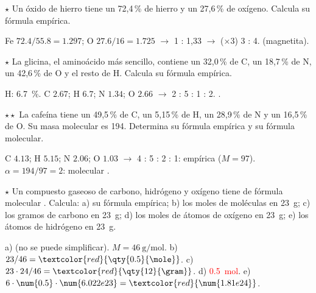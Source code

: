 \begin{exercise}
    \(\star\) Un óxido de hierro tiene un 72,4\,\% de hierro y un 27,6\,\% de oxígeno. Calcula su fórmula empírica.
    \begin{solu}
        Fe \(\num{72.4}/\num{55.8} = \num{1.297}\); O \(\num{27.6}/16 = \num{1.725}\) \(\rightarrow\) 1 : 1,33 \(\rightarrow\) (×3) 3 : 4.
        \textcolor{red}{} (magnetita).
    \end{solu}
\end{exercise}

\begin{exercise}
    \(\star\) La glicina, el aminoácido más sencillo, contiene un 32,0\,\% de C, un 18,7\,\% de N, un 42,6\,\% de O y el resto de
    H. Calcula su fórmula empírica.
    \begin{solu}
        H: \qty{6.7}{\percent}. C \(\num{2.67}\); H \(\num{6.7}\); N \(\num{1.34}\); O \(\num{2.66}\) \(\rightarrow\) 2 : 5 : 1 : 2.
        \textcolor{red}{}.
    \end{solu}
\end{exercise}

\begin{exercise}
    \(\star\star\) La cafeína tiene un 49,5\,\% de C, un 5,15\,\% de H, un 28,9\,\% de N y un 16,5\,\% de O. Su masa molecular es 194.
    Determina su fórmula empírica y su fórmula molecular.
    \begin{solu}
        C \(\num{4.13}\); H \(\num{5.15}\); N \(\num{2.06}\); O \(\num{1.03}\) \(\rightarrow\) 4 : 5 : 2 : 1: empírica \textcolor{red}{}
        (\(M = 97\)). \(\alpha = 194/97 = 2\): molecular \textcolor{red}{}.
    \end{solu}
\end{exercise}

\begin{exercise}
    \(\star\) Un compuesto gaseoso de carbono, hidrógeno y oxígeno tiene de fórmula molecular . Calcula: a) su fórmula
    empírica; b) los moles de moléculas en \qty{23}{\gram}; c) los gramos de carbono en \qty{23}{\gram}; d) los moles de átomos de
    oxígeno en \qty{23}{\gram}; e) los átomos de hidrógeno en \qty{23}{\gram}.
    \begin{solu}
        a) \textcolor{red}{} (no se puede simplificar). \(M = \qty{46}{\gram\per\mole}\). b) \(23/46 = \textcolor{red}{\qty{0.5}{\mole}}\).
        c) \(23 \cdot 24/46 = \textcolor{red}{\qty{12}{\gram}}\). d) \textcolor{red}{\qty{0.5}{\mole}}. e) \(6 \cdot \num{0.5} \cdot \num{6.022e23} = \textcolor{red}{\num{1.81e24}}\).
    \end{solu}
\end{exercise}

